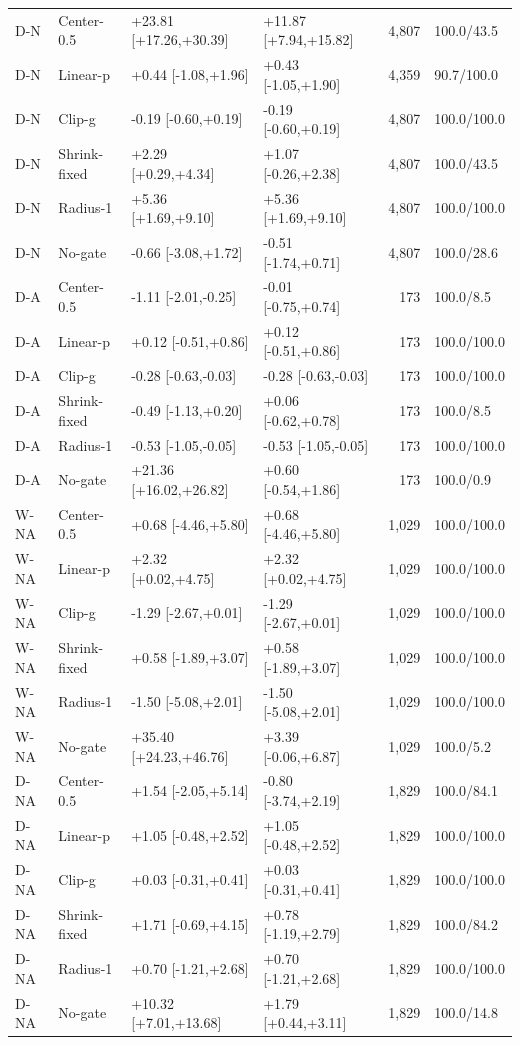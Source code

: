 \begin{table}[htbp]
\begin{tabular}{llllrl}
D-N & Center-0.5 & +23.81 [+17.26,+30.39] & +11.87 [+7.94,+15.82] & 4,807 & 100.0/43.5\\
D-N & Linear-p & +0.44 [-1.08,+1.96] & +0.43 [-1.05,+1.90] & 4,359 & 90.7/100.0\\
D-N & Clip-g & -0.19 [-0.60,+0.19] & -0.19 [-0.60,+0.19] & 4,807 & 100.0/100.0\\
D-N & Shrink-fixed & +2.29 [+0.29,+4.34] & +1.07 [-0.26,+2.38] & 4,807 & 100.0/43.5\\
D-N & Radius-1 & +5.36 [+1.69,+9.10] & +5.36 [+1.69,+9.10] & 4,807 & 100.0/100.0\\
D-N & No-gate & -0.66 [-3.08,+1.72] & -0.51 [-1.74,+0.71] & 4,807 & 100.0/28.6\\
D-A & Center-0.5 & -1.11 [-2.01,-0.25] & -0.01 [-0.75,+0.74] & 173 & 100.0/8.5\\
D-A & Linear-p & +0.12 [-0.51,+0.86] & +0.12 [-0.51,+0.86] & 173 & 100.0/100.0\\
D-A & Clip-g & -0.28 [-0.63,-0.03] & -0.28 [-0.63,-0.03] & 173 & 100.0/100.0\\
D-A & Shrink-fixed & -0.49 [-1.13,+0.20] & +0.06 [-0.62,+0.78] & 173 & 100.0/8.5\\
D-A & Radius-1 & -0.53 [-1.05,-0.05] & -0.53 [-1.05,-0.05] & 173 & 100.0/100.0\\
D-A & No-gate & +21.36 [+16.02,+26.82] & +0.60 [-0.54,+1.86] & 173 & 100.0/0.9\\
W-NA & Center-0.5 & +0.68 [-4.46,+5.80] & +0.68 [-4.46,+5.80] & 1,029 & 100.0/100.0\\
W-NA & Linear-p & +2.32 [+0.02,+4.75] & +2.32 [+0.02,+4.75] & 1,029 & 100.0/100.0\\
W-NA & Clip-g & -1.29 [-2.67,+0.01] & -1.29 [-2.67,+0.01] & 1,029 & 100.0/100.0\\
W-NA & Shrink-fixed & +0.58 [-1.89,+3.07] & +0.58 [-1.89,+3.07] & 1,029 & 100.0/100.0\\
W-NA & Radius-1 & -1.50 [-5.08,+2.01] & -1.50 [-5.08,+2.01] & 1,029 & 100.0/100.0\\
W-NA & No-gate & +35.40 [+24.23,+46.76] & +3.39 [-0.06,+6.87] & 1,029 & 100.0/5.2\\
D-NA & Center-0.5 & +1.54 [-2.05,+5.14] & -0.80 [-3.74,+2.19] & 1,829 & 100.0/84.1\\
D-NA & Linear-p & +1.05 [-0.48,+2.52] & +1.05 [-0.48,+2.52] & 1,829 & 100.0/100.0\\
D-NA & Clip-g & +0.03 [-0.31,+0.41] & +0.03 [-0.31,+0.41] & 1,829 & 100.0/100.0\\
D-NA & Shrink-fixed & +1.71 [-0.69,+4.15] & +0.78 [-1.19,+2.79] & 1,829 & 100.0/84.2\\
D-NA & Radius-1 & +0.70 [-1.21,+2.68] & +0.70 [-1.21,+2.68] & 1,829 & 100.0/100.0\\
D-NA & No-gate & +10.32 [+7.01,+13.68] & +1.79 [+0.44,+3.11] & 1,829 & 100.0/14.8\\
\bottomrule
\end{tabular}
\end{table}
